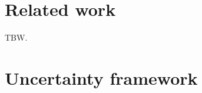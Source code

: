 \documentclass[journal]{IEEEtran}
\begin{document}
%


\section{Related work}
\label{sec::related_work}
TBW.
\section{Uncertainty framework}
\label{sec::unc_framework}
\end{document}

